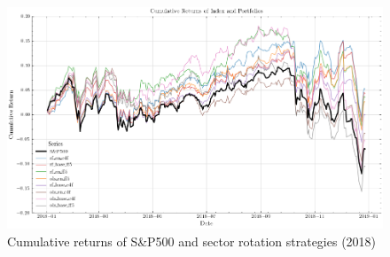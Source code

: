 


\begin{figure}[H]
    \centering
    \includegraphics[width=\textwidth]{plots/results/cum_ret_plot.png}
    \caption{Cumulative returns of S\&P500 and sector rotation strategies (2018)}\label{fig:cum_ret_plot}
\end{figure}




